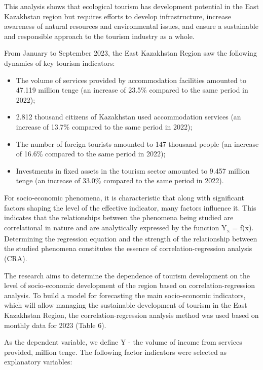 This analysis shows that ecological tourism has development potential in
the East Kazakhstan region but requires efforts to develop
infrastructure, increase awareness of natural resources and
environmental issues, and ensure a sustainable and responsible approach
to the tourism industry as a whole.

From January to September 2023, the East Kazakhstan Region saw the
following dynamics of key tourism indicators:

\begin{itemize}
\item
  The volume of services provided by accommodation facilities amounted
  to 47.119 million tenge (an increase of 23.5\% compared to the same
  period in 2022);
\item
  2.812 thousand citizens of Kazakhstan used accommodation services (an
  increase of 13.7\% compared to the same period in 2022);
\item
  The number of foreign tourists amounted to 147 thousand people (an
  increase of 16.6\% compared to the same period in 2022);
\item
  Investments in fixed assets in the tourism sector amounted to 9.457
  million tenge (an increase of 33.0\% compared to the same period in
  2022).
\end{itemize}

For socio-economic phenomena, it is characteristic that along with
significant factors shaping the level of the effective indicator, many
factors influence it. This indicates that the relationships between the
phenomena being studied are correlational in nature and are analytically
expressed by the function Y\textsubscript{x} = f(x). Determining the
regression equation and the strength of the relationship between the
studied phenomena constitutes the essence of correlation-regression
analysis (CRA).

The research aims to determine the dependence of tourism development on
the level of socio-economic development of the region based on
correlation-regression analysis. To build a model for forecasting the
main socio-economic indicators, which will allow managing the
sustainable development of tourism in the East Kazakhstan Region, the
correlation-regression analysis method was used based on monthly data
for 2023 (Table 6).

As the dependent variable, we define Y - the volume of income from
services provided, million tenge. The following factor indicators were
selected as explanatory variables:

